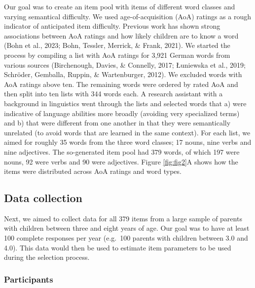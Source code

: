 \documentclass[
  man,floatsintext]{apa6}
\begin{document}
Our goal was to create an item pool with items of different word classes and varying semantical difficulty. We used age-of-acquisition (AoA) ratings as a rough indicator of anticipated item difficulty. Previous work has shown strong associations between AoA ratings and how likely children are to know a word (Bohn et al., 2023; Bohn, Tessler, Merrick, \& Frank, 2021). We started the process by compiling a list with AoA ratings for 3,921 German words from various sources (Birchenough, Davies, \& Connelly, 2017; Łuniewska et al., 2019; Schröder, Gemballa, Ruppin, \& Wartenburger, 2012). We excluded words with AoA ratings above ten. The remaining words were ordered by rated AoA and then split into ten lists with 344 words each. A research assistant with a background in linguistics went through the lists and selected words that a) were indicative of language abilities more broadly (avoiding very specialized terms) and b) that were different from one another in that they were semantically unrelated (to avoid words that are learned in the same context). For each list, we aimed for roughly 35 words from the three word classes; 17 nouns, nine verbs and nine adjectives. The so-generated item pool had 379 words, of which 197 were nouns, 92 were verbs and 90 were adjectives. Figure \ref{fig:fig2}A shows how the items were distributed across AoA ratings and word types.

\hypertarget{data-collection}{%
\subsection{Data collection}\label{data-collection}}

Next, we aimed to collect data for all 379 items from a large sample of parents with children between three and eight years of age. Our goal was to have at least 100 complete responses per year (e.g.~100 parents with children between 3.0 and 4.0). This data would then be used to estimate item parameters to be used during the selection process.

\hypertarget{participants}{%
\subsubsection{Participants}\label{participants}}
\end{document}
